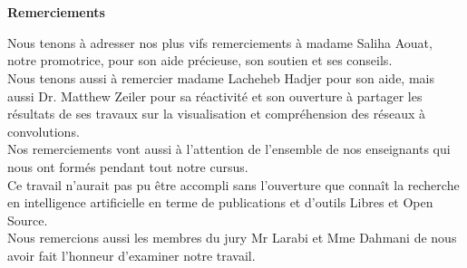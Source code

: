 
\chapter*{} %
\begin{center}
\begin{Huge}
\textbf{Remerciements}\\

\end{Huge}
\end{center}

	Nous tenons à adresser nos plus vifs remerciements à madame Saliha Aouat, notre promotrice, pour son aide précieuse, son soutien et ses conseils.\\ 

	Nous tenons aussi à remercier madame Lacheheb Hadjer pour son aide, mais aussi Dr. Matthew Zeiler pour sa réactivité et son ouverture à partager les résultats de ses travaux sur la visualisation et compréhension des réseaux à convolutions.\\

	Nos remerciements vont aussi à l'attention de l'ensemble de nos enseignants qui nous ont formés pendant tout notre cursus.\\

	Ce travail n'aurait pas pu être accompli sans l'ouverture que connaît la recherche en intelligence artificielle en terme de publications et d'outils Libres et Open Source.\\
	
	Nous remercions aussi les membres du jury Mr Larabi et Mme Dahmani de nous avoir fait l'honneur d'examiner notre travail.



